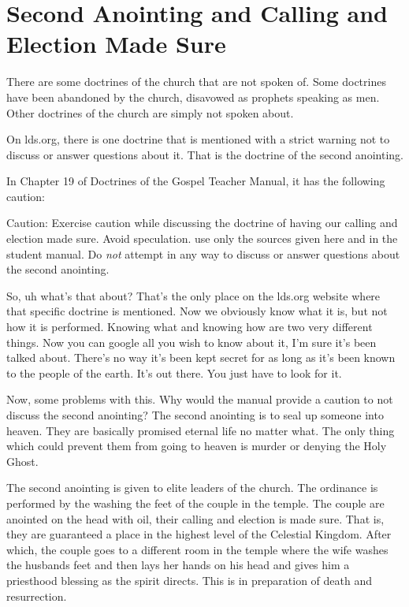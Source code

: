 \section{Second Anointing and Calling and Election Made Sure}

There are some doctrines of the church that are not spoken of. Some doctrines 
have been abandoned by the church, disavowed as prophets speaking as men. 
Other doctrines of the church are simply not spoken about.

On lds.org, there is one doctrine that is mentioned with a strict warning not to 
discuss or answer questions about it. That is the doctrine of the second 
anointing.

In Chapter 19 of Doctrines of the Gospel Teacher Manual, it has the following 
caution:

\begin{displayquote}
Caution: Exercise caution while discussing the doctrine of having our calling 
and election made sure. Avoid speculation. use only the sources given here and 
in the student manual. Do \textit{not} attempt in any way to discuss or answer 
questions about the second anointing.
\end{displayquote}

So, uh what’s that about? That’s the only place on the lds.org website where 
that specific doctrine is mentioned. Now we obviously know what it is, but not 
how it is performed. Knowing what and knowing how are two very different things. 
Now you can google all you wish to know about it, I’m sure it’s been talked 
about. There’s no way it’s been kept secret for as long as it’s been known to 
the people of the earth. It’s out there. You just have to look for it.

 Now, some problems with this. Why would the manual provide a caution to not 
 discuss the second anointing? The second anointing is to seal up someone into 
 heaven. They are basically promised eternal life no matter what. The only thing 
 which could prevent them from going to heaven is murder or denying the Holy 
 Ghost.
 
 The second anointing is given to elite leaders of the church. The ordinance is 
 performed by the washing the feet of the couple in the temple. The couple are 
 anointed on the head with oil, their calling and election is made sure. That 
 is, they are guaranteed a place in the highest level of the Celestial Kingdom. 
 After which, the couple goes to a different room in the temple where the wife 
 washes the husbands feet and then lays her hands on his head and gives him a 
 priesthood blessing as the spirit directs. This is in preparation of death and 
 resurrection.
 
